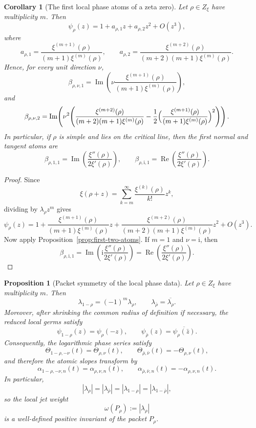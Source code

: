 \documentclass[11pt]{amsart}
\numberwithin{equation}{section}
\newtheorem{proposition}[theorem]{Proposition}
\newtheorem{corollary}[theorem]{Corollary}
\theoremstyle{definition}
\theoremstyle{remark}
\DeclareMathOperator{\Rea}{Re}
\DeclareMathOperator{\Ima}{Im}
\newcommand{\ii}{\mathrm i}
\begin{document}
\begin{corollary}[The first local phase atoms of a zeta zero]\label{cor:zeta-first-atoms}
Let $\rho\in Z_\xi$ have multiplicity $m$.  Then
\[
\psi_\rho(z)=1+a_{\rho,1} z+a_{\rho,2} z^2+O(z^3),
\]
where
\[
a_{\rho,1}=\frac{\xi^{(m+1)}(\rho)}{(m+1)\xi^{(m)}(\rho)},
\qquad
a_{\rho,2}=\frac{\xi^{(m+2)}(\rho)}{(m+2)(m+1)\xi^{(m)}(\rho)}.
\]
Hence, for every unit direction $\nu$,
\[
\beta_{\rho,\nu,1}=\Ima\!\left(\nu\frac{\xi^{(m+1)}(\rho)}{(m+1)\xi^{(m)}(\rho)}\right),
\]
and
\[
\beta_{\rho,\nu,2}=\Ima\!\left(\nu^2\Biggl(\frac{\xi^{(m+2)}(\rho)}{(m+2)(m+1)\xi^{(m)}(\rho)}-
\frac12\Bigl(\frac{\xi^{(m+1)}(\rho)}{(m+1)\xi^{(m)}(\rho)}\Bigr)^2\Biggr)\right).
\]
In particular, if $\rho$ is simple and lies on the critical line, then the first normal and tangent atoms are
\[
\beta_{\rho,1,1}=\Ima\!\left(\frac{\xi''(\rho)}{2\xi'(\rho)}\right),
\qquad
\beta_{\rho,\ii,1}=\Rea\!\left(\frac{\xi''(\rho)}{2\xi'(\rho)}\right).
\]
\end{corollary}

\begin{proof}
Since
\[
\xi(\rho+z)=\sum_{k=m}^{\infty}\frac{\xi^{(k)}(\rho)}{k!}z^k,
\]
dividing by $\lambda_\rho z^m$ gives
\[
\psi_\rho(z)=1+
\frac{\xi^{(m+1)}(\rho)}{(m+1)\xi^{(m)}(\rho)}z+
\frac{\xi^{(m+2)}(\rho)}{(m+2)(m+1)\xi^{(m)}(\rho)}z^2+O(z^3).
\]
Now apply Proposition~\ref{prop:first-two-atoms}.  If $m=1$ and $\nu=\ii$, then
\[
\beta_{\rho,\ii,1}=\Ima\!\left(\ii\frac{\xi''(\rho)}{2\xi'(\rho)}\right)=\Rea\!\left(\frac{\xi''(\rho)}{2\xi'(\rho)}\right).
\]
\end{proof}

\begin{proposition}[Packet symmetry of the local phase data]\label{prop:packet-symmetry-local}
Let $\rho\in Z_\xi$ have multiplicity $m$.  Then
\[
\lambda_{1-\rho}=(-1)^m\lambda_\rho,
\qquad
\lambda_{\bar\rho}=\overline{\lambda_\rho}.
\]
Moreover, after shrinking the common radius of definition if necessary, the reduced local germs satisfy
\[
\psi_{1-\rho}(z)=\psi_\rho(-z),
\qquad
\psi_{\bar\rho}(z)=\overline{\psi_\rho(\bar z)}.
\]
Consequently, the logarithmic phase series satisfy
\[
\Theta_{1-\rho,-\nu}(t)=\Theta_{\rho,\nu}(t),
\qquad
\Theta_{\bar\rho,\bar\nu}(t)=-\Theta_{\rho,\nu}(t),
\]
and therefore the atomic slopes transform by
\[
\alpha_{1-\rho,-\nu,n}(t)=\alpha_{\rho,\nu,n}(t),
\qquad
\alpha_{\bar\rho,\bar\nu,n}(t)=-\alpha_{\rho,\nu,n}(t).
\]
In particular,
\[
|\lambda_{\rho}|=|\lambda_{\bar\rho}|=|\lambda_{1-\rho}|=|\lambda_{1-\bar\rho}|,
\]
so the local jet weight
\[
\omega(P_\rho):=|\lambda_\rho|
\]
is a well-defined positive invariant of the packet $P_\rho$.
\end{proposition}
\end{document}
